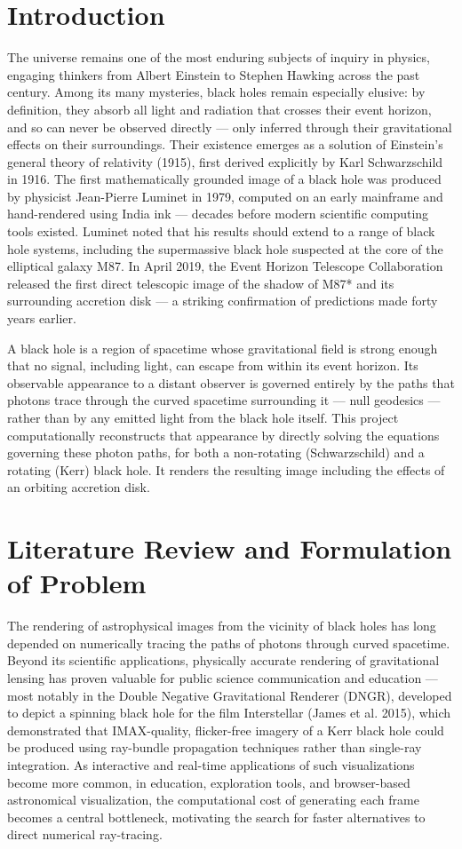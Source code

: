 \documentclass[12pt]{article}
\begin{document}
\section{Introduction}
The universe remains one of the most enduring subjects of inquiry in physics, engaging thinkers from Albert Einstein to Stephen Hawking across the past century. Among its many mysteries, black holes remain especially elusive: by definition, they absorb all light and radiation that crosses their event horizon, and so can never be observed directly — only inferred through their gravitational effects on their surroundings. Their existence emerges as a solution of Einstein's general theory of relativity (1915), first derived explicitly by Karl Schwarzschild in 1916.
The first mathematically grounded image of a black hole was produced by physicist Jean-Pierre Luminet in 1979, computed on an early mainframe and hand-rendered using India ink — decades before modern scientific computing tools existed. Luminet noted that his results should extend to a range of black hole systems, including the supermassive black hole suspected at the core of the elliptical galaxy M87. In April 2019, the Event Horizon Telescope Collaboration released the first direct telescopic image of the shadow of M87* and its surrounding accretion disk — a striking confirmation of predictions made forty years earlier.

A black hole is a region of spacetime whose gravitational field is strong enough that no signal, including light, can escape from within its event horizon. Its observable appearance to a distant observer is governed entirely by the paths that photons trace through the curved spacetime surrounding it — null geodesics — rather than by any emitted light from the black hole itself. This project computationally reconstructs that appearance by directly solving the equations governing these photon paths, for both a non-rotating (Schwarzschild) and a rotating (Kerr) black hole. It renders the resulting image including the effects of an orbiting accretion disk. 

\newpage
\section{\textbf{Literature Review and Formulation of Problem}}
The rendering of astrophysical images from the vicinity of black holes has long depended on numerically tracing the paths of photons through curved spacetime. Beyond its scientific applications, physically accurate rendering of gravitational lensing has proven valuable for public science communication and education — most notably in the Double Negative Gravitational Renderer (DNGR)\cite{james2015}, developed to depict a spinning black hole for the film Interstellar (James et al. 2015), which demonstrated that IMAX-quality, flicker-free imagery of a Kerr black hole could be produced using ray-bundle propagation techniques rather than single-ray integration. As interactive and real-time applications of such visualizations become more common, in education, exploration tools, and browser-based astronomical visualization, the computational cost of generating each frame becomes a central bottleneck, motivating the search for faster alternatives to direct numerical ray-tracing.
\end{document}
